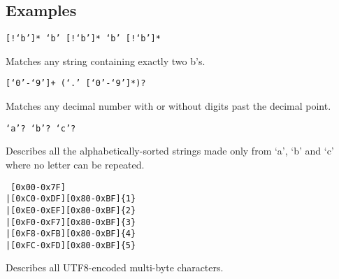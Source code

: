 
\subsection{Examples}
{
	\begin{itemize}
	{
		\item[] \texttt{[!{}`b']* `b' [!{}`b']* `b' [!{}`b']*}
		
			Matches any string containing exactly two b's.
		
		\item[] \texttt{[`0'-`9']+ (`.' [`0'-`9']*)?}
		
			Matches any decimal number with or without digits
			past the decimal point.
		
		\item[] \texttt{`a'? `b'? `c'?}
		
			Describes all the alphabetically-sorted strings made only
			from `a', `b' and `c' where no letter can be repeated.
		
		\item[]
\begin{lstlisting}
 [0x00-0x7F]
|[0xC0-0xDF][0x80-0xBF]{1}
|[0xE0-0xEF][0x80-0xBF]{2}
|[0xF0-0xF7][0x80-0xBF]{3}
|[0xF8-0xFB][0x80-0xBF]{4}
|[0xFC-0xFD][0x80-0xBF]{5}
\end{lstlisting}
			Describes all UTF8-encoded multi-byte characters.
	}
	\end{itemize}
}
